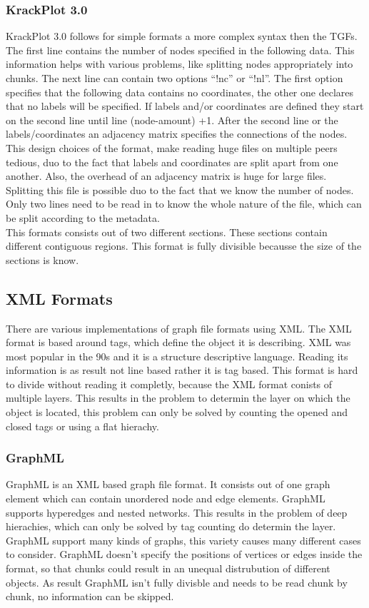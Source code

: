 \subsubsection{KrackPlot 3.0}
KrackPlot 3.0 follows for simple formats a more complex syntax then the TGFs. The first line contains the number of nodes specified in the following data. This information helps with various problems, like splitting nodes appropriately into chunks. The next line can contain two options “!nc” or “!nl”. The first option specifies that the following data contains no coordinates, the other one declares that no labels will be specified. If labels and/or coordinates are defined they start on the second line until line (node-amount) +1. After the second line or the labels/coordinates an adjacency matrix specifies the connections of the nodes.
This design choices of the format, make reading huge files on multiple peers tedious, duo to the fact that labels and coordinates are split apart from one another. Also, the overhead of an adjacency matrix is huge for large files.
Splitting this file is possible duo to the fact that we know the number of nodes. Only two lines need to be read in to know the whole nature of the file, which can be split according to the metadata.\cite{D.KrackhardtJ.BlytheC.McGrath.4.12.2001}\\
This formats consists out of two different sections. These sections contain different contiguous regions. This format is fully divisible becausse the size of the sections is know. 

\subsection{XML Formats}
There are various implementations of graph file formats using XML. The XML format is based around tags, which define the object it is describing. XML was most popular in the 90s and it is a structure descriptive language. Reading its information is as result not line based rather it is tag based. This format is hard to divide without reading it completly, because the XML format conists of multiple layers. This results in the problem to determin the layer on which the object is located, this problem can only be solved by counting the opened and closed tags or using a flat hierachy.\cite{bray1997extensible,Roughan.10.03.2015}


\subsubsection{GraphML}
GraphML is an XML based graph file format. It consists out of one graph element which can contain unordered node and edge elements. GraphML supports hyperedges and nested networks. This results in the problem of deep hierachies, which can only be solved by tag counting do determin the layer. GraphML support many kinds of graphs, this variety causes many different cases to consider. GraphML doesn't specify the positions of vertices or edges inside the format, so that chunks could result in an unequal distrubution of different objects. As result GraphML isn't fully divisble and needs to be read chunk by chunk, no information can be skipped.\cite{brandes2013graph,kuhner2013graphml}

